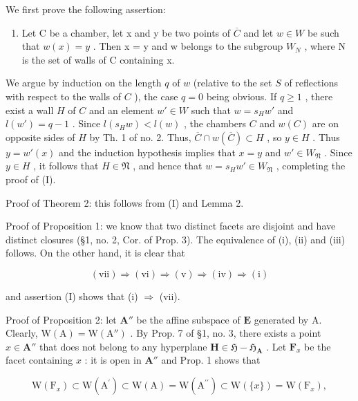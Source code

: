We first prove the following assertion:

\begin{enumerate}
\def\labelenumi{(\Roman{enumi})}
\tightlist
\item
  Let C be a chamber, let x and y be two points of \(\overline{C}\) and let \(w \in W\) be such that \(w(x) = y\) . Then x = y and w belongs to the subgroup \(W_{N}\) , where N is the set of walls of C containing x.
\end{enumerate}

We argue by induction on the length \(q\) of \(w\) (relative to the set \(S\) of reflections with respect to the walls of \(C\) ), the case \(q = 0\) being obvious. If \(q \geqslant 1\) , there exist a wall \(H\) of \(C\) and an element \(w' \in W\) such that \(w = s_H w'\) and \(l(w') = q - 1\) . Since \(l(s_H w) < l(w)\) , the chambers \(C\) and \(w(C)\) are on opposite sides of \(H\) by Th. 1 of no. 2. Thus, \(\overline{C} \cap w(\overline{C}) \subset H\) , so \(y \in H\) . Thus \(y = w'(x)\) and the induction hypothesis implies that \(x = y\) and \(w' \in W_{\mathfrak{N}}\) . Since \(y \in H\) , it follows that \(H \in \mathfrak{N}\) , and hence that \(w = s_H w' \in W_{\mathfrak{N}}\) , completing the proof of (I).

Proof of Theorem 2: this follows from (I) and Lemma 2.

Proof of Proposition 1: we know that two distinct facets are disjoint and have distinct closures (§1, no. 2, Cor. of Prop. 3). The equivalence of (i), (ii) and (iii) follows. On the other hand, it is clear that

\[
(\mathrm{vii}) \Longrightarrow (\mathrm{vi}) \Longrightarrow (\mathrm{v}) \Longrightarrow (\mathrm{iv}) \Longrightarrow (\mathrm{i})
\]

and assertion (I) shows that (i) \(\Longrightarrow\) (vii).

Proof of Proposition 2: let \(\mathbf{A}''\) be the affine subspace of \(\mathbf{E}\) generated by A. Clearly, \(\mathrm{W(A)} = \mathrm{W(A'')}\) . By Prop. 7 of §1, no. 3, there exists a point \(x \in \mathbf{A}''\) that does not belong to any hyperplane \(\mathbf{H} \in \mathfrak{H} - \mathfrak{H}_{\mathbf{A}}\) . Let \(\mathbf{F}_x\) be the facet containing \(x\) : it is open in \(\mathbf{A}''\) and Prop. 1 shows that

\[
\mathrm{W} \left(\mathrm{F} _ {x}\right) \subset \mathrm{W} \left(\mathrm{A} ^ {\prime}\right) \subset \mathrm{W} (\mathrm{A}) = \mathrm{W} \left(\mathrm{A} ^ {\prime \prime}\right) \subset \mathrm{W} (\{x \}) = \mathrm{W} \left(\mathrm{F} _ {x}\right),
\]

